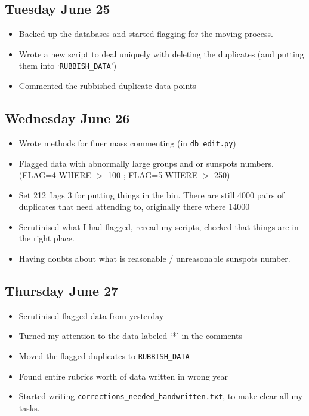 \documentclass[12pt]{article}
\begin{document}
\subsection{Tuesday June 25}
\begin{itemize}
    \item Backed up the databases and started flagging for the moving process.
    \item Wrote a new script to deal uniquely with deleting the duplicates (and putting them into `\texttt{RUBBISH\_DATA}')
    \item Commented the rubbished duplicate data points
\end{itemize}
    
\subsection{Wednesday June 26}
\begin{itemize}
    \item Wrote methods for finer mass commenting (in \texttt{db\_edit.py})
    \item Flagged data with abnormally large groups and or sunspots numbers. (FLAG=4 WHERE $>$ 100 ; FLAG=5 WHERE $>$ 250)
    \item Set 212 flags 3 for putting things in the bin. There are still 4000 pairs of duplicates that need attending to, originally there where 14000
    \item Scrutinised what I had flagged, reread my scripts, checked that things are in the right place.
    \item Having doubts about what is reasonable / unreasonable sunspots number.
\end{itemize}
    
\subsection{Thursday June 27}
\begin{itemize}
    \item Scrutinised flagged data from yesterday
    \item Turned my attention to the data labeled `*' in the comments
    \item Moved the flagged duplicates to \texttt{RUBBISH\_DATA}
    \item Found entire rubrics worth of data written in wrong year
    \item Started writing \texttt{corrections\_needed\_handwritten.txt}, to make clear all my tasks.
\end{itemize}
    
\end{document}

